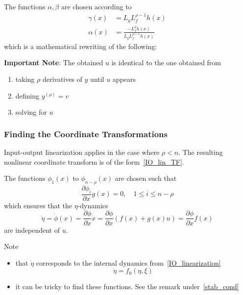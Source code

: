 \newpar{}
The functions $\alpha, \beta$ are chosen according to
\begin{align*}
    \gamma(x) & = L_g L_f^{\rho - 1} h(x)                        \\
    \alpha(x) & = \frac{-L_f^\rho h(x)}{L_g L_f^{\rho - 1} h(x)}
\end{align*}
which is a mathematical rewriting of the following:

\textbf{Important Note}: The obtained $u$ is identical to the one obtained from
\begin{enumerate}
    \item taking $\rho$ derivatives of $y$ until $u$ appears
    \item defining $y^{(\rho)} = v$
    \item solving for $u$
\end{enumerate}

\subsubsection{Finding the Coordinate Transformations}
Input-output linearization applies in the case where $\rho < n$. The resulting nonlinear coordinate transform is of the form~\ref{IO_lin_TF}.
\newpar{}

The functions $\phi_1(x)$ to $\phi_{n - \rho}(x)$ are chosen such that
\begin{equation*}
    \frac{\partial \phi_i}{\partial x} g(x) = 0, \quad 1 \le i \le n - \rho
\end{equation*}
which ensures that the $\eta$-dynamics
\begin{equation*}
    \dot{\eta} = \dot{\phi}(x) = \frac{\partial \phi}{\partial x} \dot{x} =\frac{\partial \phi}{\partial x}(f(x) + g(x)u) = \frac{\partial \phi}{\partial x} f(x)
\end{equation*}
are independent of $u$.

Note
\begin{itemize}
    \item that $\dot{\eta}$ corresponds to the internal dynamics from~\ref{IO_linearization}
          \begin{equation*}
              \dot{\eta} = f_0(\eta, \xi)
          \end{equation*}
    \item it can be tricky to find these functions. See the remark under~\ref{stab_cond}
\end{itemize}

\newpar{}


